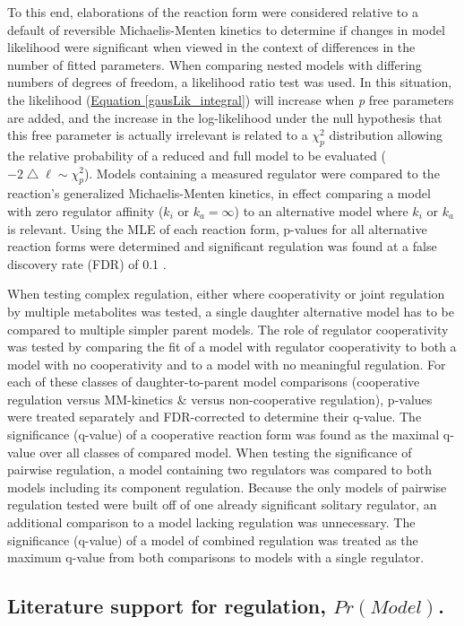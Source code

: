To this end, elaborations of the reaction form were considered relative to a default of reversible Michaelis-Menten kinetics to determine if changes in model likelihood were significant when viewed in the context of differences in the number of fitted parameters.  When comparing nested models with differing numbers of degrees of freedom, a likelihood ratio test was used.  In this situation, the likelihood (\hyperref[gausLik_integral]{Equation \ref{gausLik_integral}}) will increase when \textit{p} free parameters are added, and the increase in the log-likelihood under the null hypothesis that this free parameter is actually irrelevant is related to a $\chi^{2}_{p}$ distribution allowing the relative probability of a reduced and full model to be evaluated ($-2\bigtriangleup\ell \sim \chi^{2}_{p}$). Models containing a measured regulator were compared to the reaction's generalized Michaelis-Menten kinetics, in effect comparing a model with zero regulator affinity ($k_{i}$ or $k_{a} = \infty$) to an alternative model where $k_{i}$ or $k_{a}$ is relevant.  Using the MLE of each reaction form, p-values for all alternative reaction forms were determined and significant regulation was found at a false discovery rate (FDR) of 0.1 \cite{Storey:2003cj}.

When testing complex regulation, either where cooperativity or joint regulation by multiple metabolites was tested, a single daughter alternative model has to be compared to multiple simpler parent models.  The role of regulator cooperativity was tested by comparing the fit of a model with regulator cooperativity to both a model with no cooperativity and to a model with no meaningful regulation.  For each of these classes of daughter-to-parent model comparisons (cooperative regulation versus MM-kinetics \& versus non-cooperative regulation), p-values were treated separately and FDR-corrected to determine their q-value.  The significance (q-value) of a cooperative reaction form was found as the maximal q-value over all classes of compared model.  When testing the significance of pairwise regulation, a model containing two regulators was compared to both models including its component regulation.  Because the only models of pairwise regulation tested were built off of one already significant solitary regulator, an additional comparison to a model lacking regulation was unnecessary.  The significance (q-value) of a model of combined regulation was treated as the maximum q-value from both comparisons to models with a single regulator.

\subsection*{Literature support for regulation, $Pr(Model)$.}

